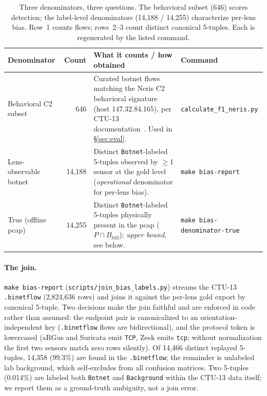 \documentclass[11pt,a4paper]{article}
\begin{document}
    \begin{table}[h]
        \centering
        \footnotesize
        \caption{Three denominators, three questions. The behavioral subset (646) scores
        detection; the label-level denominators (14{,}188 / 14{,}255) characterize per-lens
        bias. Row~1 counts flows; rows~2--3 count distinct canonical 5-tuples. Each is
        regenerated by the listed command.}
        \label{tab:denominators}
        \begin{tabular}{p{3.1cm}rp{4.2cm}l}
            \toprule
            \textbf{Denominator} & \textbf{Count} & \textbf{What it counts / how obtained} & \textbf{Command} \\
            \midrule
            Behavioral C2 subset & 646 &
            Curated botnet flows matching the Neris C2 behavioral signature (host
            147.32.84.165), per CTU-13 documentation~\cite{garcia2014}. Used in \S\ref{sec:eval}. &
            \texttt{calculate\_f1\_neris.py} \\
            \addlinespace
            Lens-observable botnet & 14{,}188 &
            Distinct \texttt{Botnet}-labeled 5-tuples observed by $\geq$1 sensor at the gold
            level (\emph{operational} denominator for per-lens bias). &
            \texttt{make bias-report} \\
            \addlinespace
            True (offline pcap) & 14{,}255 &
            Distinct \texttt{Botnet}-labeled 5-tuples physically present in the pcap
            ($P \cap B_{\text{full}}$); \emph{upper bound}, see below. &
            \texttt{make bias-denominator-true} \\
            \bottomrule
        \end{tabular}
    \end{table}

    \paragraph{The join.}
    \texttt{make bias-report} (\texttt{scripts/join\_bias\_labels.py}) streams the CTU-13
    \texttt{.binetflow} (2{,}824{,}636 rows) and joins it against the per-lens gold export by
    canonical 5-tuple. Two decisions make the join faithful and are enforced in code rather
    than assumed: the endpoint pair is canonicalized to an orientation-independent key
    (\texttt{.binetflow} flows are bidirectional), and the protocol token is lowercased (aRGus
    and Suricata emit \texttt{TCP}, Zeek emits \texttt{tcp}; without normalization the first
    two sensors match zero rows silently). Of 14{,}466 distinct replayed 5-tuples, 14{,}358
    (99.3\%) are found in the \texttt{.binetflow}; the remainder is unlabeled lab background,
    which self-excludes from all confusion matrices. Two 5-tuples (0.014\%) are labeled both
    \texttt{Botnet} and \texttt{Background} within the CTU-13 data itself; we report them as a
    ground-truth ambiguity, not a join error.
\end{document}
